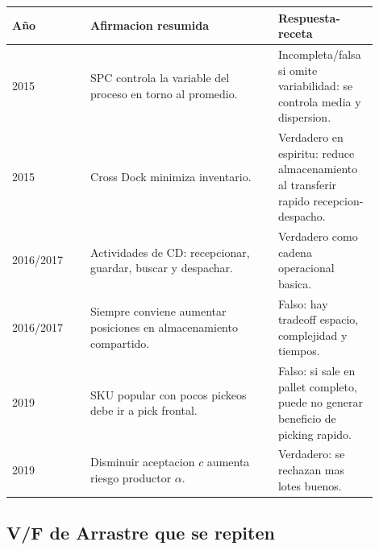 \begin{longtable}{p{0.20\linewidth}p{0.48\linewidth}p{0.22\linewidth}}
\toprule
Año & Afirmacion resumida & Respuesta-receta \\
\midrule
\endhead
2015 & SPC controla la variable del proceso en torno al promedio. & Incompleta/falsa si omite variabilidad: se controla media y dispersion. \\
2015 & Cross Dock minimiza inventario. & Verdadero en espiritu: reduce almacenamiento al transferir rapido recepcion-despacho. \\
2016/2017 & Actividades de CD: recepcionar, guardar, buscar y despachar. & Verdadero como cadena operacional basica. \\
2016/2017 & Siempre conviene aumentar posiciones en almacenamiento compartido. & Falso: hay tradeoff espacio, complejidad y tiempos. \\
2019 & SKU popular con pocos pickeos debe ir a pick frontal. & Falso: si sale en pallet completo, puede no generar beneficio de picking rapido. \\
2019 & Disminuir aceptacion $c$ aumenta riesgo productor $\alpha$. & Verdadero: se rechazan mas lotes buenos. \\
\bottomrule
\end{longtable}

\subsection{V/F de Arrastre que se repiten}

